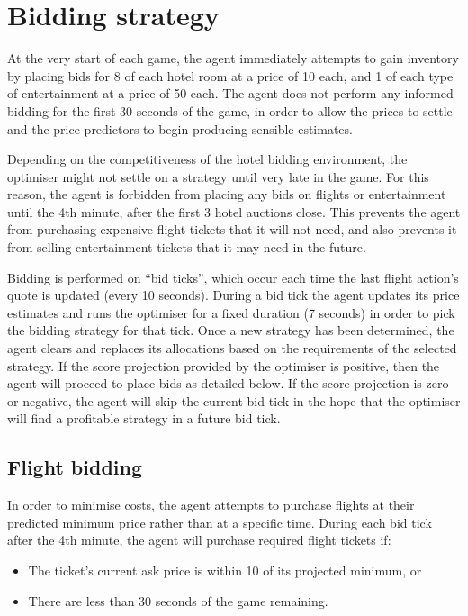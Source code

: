 \documentclass[a4paper]{proc}
\begin{document}
\section{Bidding strategy}

At the very start of each game, the agent immediately attempts to gain inventory by placing bids for 8 of each hotel room at a price of 10 each, and 1 of each type of entertainment at a price of 50 each. The agent does not perform any informed bidding for the first 30 seconds of the game, in order to allow the prices to settle and the price predictors to begin producing sensible estimates.

Depending on the competitiveness of the hotel bidding environment, the optimiser might not settle on a strategy until very late in the game. For this reason, the agent is forbidden from placing any bids on flights or entertainment until the 4th minute, after the first 3 hotel auctions close. This prevents the agent from purchasing expensive flight tickets that it will not need, and also prevents it from selling entertainment tickets that it may need in the future.

Bidding is performed on ``bid ticks'', which occur each time the last flight action's quote is updated (every 10 seconds). During a bid tick the agent updates its price estimates and runs the optimiser for a fixed duration (7 seconds) in order to pick the bidding strategy for that tick. Once a new strategy has been determined, the agent clears and replaces its allocations based on the requirements of the selected strategy. If the score projection provided by the optimiser is positive, then the agent will proceed to place bids as detailed below. If the score projection is zero or negative, the agent will skip the current bid tick in the hope that the optimiser will find a profitable strategy in a future bid tick.

\subsection{Flight bidding}

In order to minimise costs, the agent attempts to purchase flights at their predicted minimum price rather than at a specific time. During each bid tick after the 4th minute, the agent will purchase required flight tickets if:

\begin{itemize}
  \item The ticket's current ask price is within 10 of its projected minimum, or
  \item There are less than 30 seconds of the game remaining.
\end{itemize}
\end{document}

